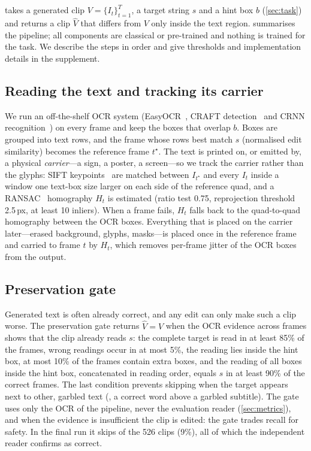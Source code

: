 \section{\method}
\label{sec:method}


\method takes a generated clip $V=\{I_t\}_{t=1}^{T}$, a target string $s$ and a hint box $b$ (\cref{sec:task}) and returns a clip $\hat V$ that differs from $V$ only inside the text region.  summarises the pipeline; all components are classical or pre-trained and nothing is trained for the task. We describe the steps in order and give thresholds and implementation details in the supplement.

\subsection{Reading the text and tracking its carrier}
\label{sec:read}
We run an off-the-shelf OCR system (EasyOCR~\cite{easyocr}, CRAFT detection~\cite{baek2019craft} and CRNN recognition~\cite{shi2017crnn}) on every frame and keep the boxes that overlap $b$. Boxes are grouped into text rows, and the frame whose rows best match $s$ (normalised edit similarity) becomes the reference frame $t^\star$. The text is printed on, or emitted by, a physical \emph{carrier}---a sign, a poster, a screen---so we track the carrier rather than the glyphs: SIFT keypoints~\cite{lowe2004sift} are matched between $I_{t^\star}$ and every $I_t$ inside a window one text-box size larger on each side of the reference quad, and a RANSAC~\cite{fischler1981ransac} homography $H_t$ is estimated (ratio test 0.75, reprojection threshold 2.5\,px, at least 10 inliers). When a frame fails, $H_t$ falls back to the quad-to-quad homography between the OCR boxes. Everything that is placed on the carrier later---erased background, glyphs, masks---is placed once in the reference frame and carried to frame $t$ by $H_t$, which removes per-frame jitter of the OCR boxes from the output.

\subsection{Preservation gate}
\label{sec:pres}
Generated text is often already correct, and any edit can only make such a clip worse. The preservation gate returns $\hat V=V$ when the OCR evidence across frames shows that the clip already reads $s$: the complete target is read in at least 85\% of the frames, wrong readings occur in at most 5\%, the reading lies inside the hint box, at most 10\% of the frames contain extra boxes, and the reading of all boxes inside the hint box, concatenated in reading order, equals $s$ in at least 90\% of the correct frames. The last condition prevents skipping when the target appears next to other, garbled text (\eg, a correct word above a garbled subtitle). The gate uses only the OCR of the pipeline, never the evaluation reader (\cref{sec:metrics}), and when the evidence is insufficient the clip is edited: the gate trades recall for safety. In the final run it skips \rSkipped{} of the 526 clips (9\%), all of which the independent reader confirms as correct.

